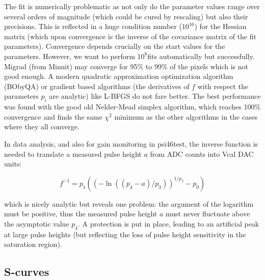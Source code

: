 \documentclass[english]{article}
\begin{document}
The fit is numerically problematic as not only do the parameter values
range over several orders of magnitude (which could be cured by rescaling)
but also their precisions. This is reflected in a huge condition number
($10^{16}$) for the Hessian matrix (which upon convergence is the
inverse of the covariance matrix of the fit parameters). Convergence
depends crucially on the start values for the parameters. However,
we want to perform $10^{8}$fits automatically but successfully. Migrad
(from Minuit) may converge for 95\% to 99\% of the pixels which is
not good enough. A modern quadratic approximation optimization algorithm
(BObyQA) or gradient based algorithms (the derivatives of $f$ with
respect the parameters $p_{i}$ are analytic) like L-BFGS do not fare
better. The best performance was found with the good old Nelder-Mead
simplex algorithm, which reaches 100\% convergence and finds the same
$\chi^{2}$ minimum as the other algorithms in the cases where they
all converge.

In data analysis, and also for gain monitoring in psi46test, the inverse
function is needed to translate a measured pulse height $a$ from
ADC counts into Vcal DAC units:

\[
f^{-1}=p_{1}\left(\left(-\ln\left((p_{4}-a)/p_{3}\right)\right)^{1/p_{2}}-p_{0}\right)\]


which is nicely analytic but reveals one problem: the argument of
the logarithm must be positive, thus the measured pulse height $a$
must never fluctuate above the asymptotic value $p_{4}$. A protection
is put in place, leading to an artificial peak at large pulse heights
(but reflecting the loss of pulse height sensitivity in the saturation
region).


\subsection{S-curves}
\end{document}
